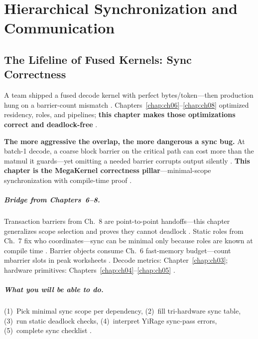 \chapter{Hierarchical Synchronization and Communication}
\label{chap:ch09}

\section{The Lifeline of Fused Kernels: Sync Correctness}
\label{sec:industrial_hook}

A team shipped a fused decode kernel with perfect bytes/token---then production hung on a barrier-count mismatch \citep{shah2024flashattention3,taxbreak2026,yirage2026}.
Chapters~\ref{chap:ch06}--\ref{chap:ch08} optimized residency, roles, and pipelines; \textbf{this chapter makes those optimizations correct and deadlock-free} \citep{nvidia2022hopper,dao2022flashattention,mpk2025}.

\textbf{The more aggressive the overlap, the more dangerous a sync bug.} At batch-1 decode, a coarse block barrier on the critical path can cost more than the matmul it guards---yet omitting a needed barrier corrupts output silently \citep{patel2025llminference,memoryfloor2026,taxbreak2026}.
\textbf{This chapter is the MegaKernel correctness pillar}---minimal-scope synchronization with compile-time proof \citep{yirage2026,wu2024mirage,shah2024flashattention3}.

\paragraph{Bridge from Chapters~6--8.}
Transaction barriers from Ch.~8 are point-to-point handoffs---this chapter generalizes scope selection and proves they cannot deadlock \citep{semianalysis2024tma,shah2024flashattention3}.
Static roles from Ch.~7 fix who coordinates---sync can be minimal only because roles are known at compile time \citep{yirage2026,mpk2025}.
Barrier objects consume Ch.~6 fast-memory budget---count mbarrier slots in peak worksheets \citep{memoryfloor2026,chen2020compilerbasedhardw}.
Decode metrics: Chapter~\ref{chap:ch03}; hardware primitives: Chapters~\ref{chap:ch04}--\ref{chap:ch05} \citep{patel2025llminference,nvidia2022hopper,amd2024xdna}.

\paragraph{What you will be able to do.}
(1)~Pick minimal sync scope per dependency, (2)~fill tri-hardware sync table, (3)~run static deadlock checks, (4)~interpret YiRage sync-pass errors, (5)~complete sync checklist \citep{yirage2026,shah2024flashattention3,taxbreak2026}.

